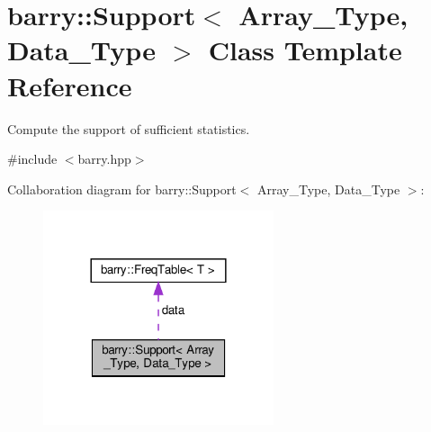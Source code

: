\hypertarget{classbarry_1_1_support}{}\section{barry\+:\+:Support$<$ Array\+\_\+\+Type, Data\+\_\+\+Type $>$ Class Template Reference}
\label{classbarry_1_1_support}


Compute the support of sufficient statistics.  




{\ttfamily \#include $<$barry.\+hpp$>$}



Collaboration diagram for barry\+:\+:Support$<$ Array\+\_\+\+Type, Data\+\_\+\+Type $>$\+:\nopagebreak
\begin{figure}[H]
\begin{center}
\leavevmode
\includegraphics[width=192pt]{classbarry_1_1_support__coll__graph}
\end{center}
\end{figure}

